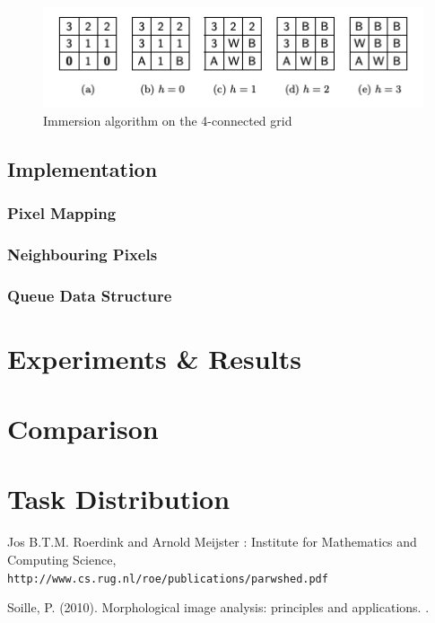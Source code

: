 \documentclass{article}
\begin{document}
\begin{figure}[H]
    \centering
    \includegraphics[width=\linewidth]{example1.png}
    \caption{Immersion algorithm on the 4-connected grid}
    \label{fig:example_1}
\end{figure}

\subsection{Implementation}
\subsubsection{Pixel Mapping}
\subsubsection{Neighbouring Pixels}
\subsubsection{Queue Data Structure}

\section{Experiments & Results}


\section{Comparison}


\section{Task Distribution}


\newpage

\begin{thebibliography}{9}
\label{sec:hello}



Jos B.T.M. Roerdink and Arnold Meijster : \newline
Institute for Mathematics and Computing Science, 
\\\texttt{http://www.cs.rug.nl/roe/publications/parwshed.pdf}


Soille, P. (2010). Morphological image analysis: principles and applications. 
. 

\end{thebibliography}
\end{document}
